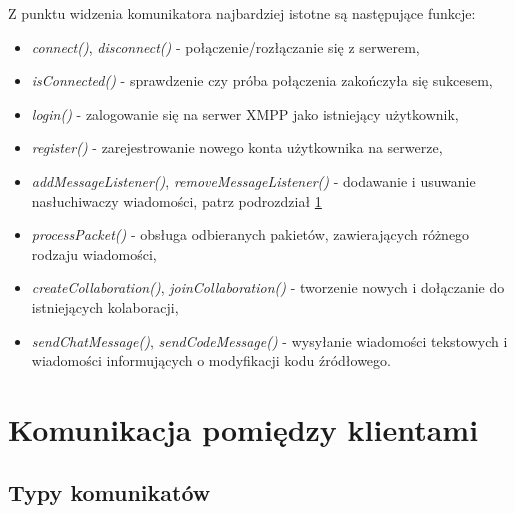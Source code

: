 \documentclass[polish,11pt,a4paper,twoside]{article}
\newenvironment{items}{
\begin{itemize}
  \setlength{\itemsep}{0pt}
  \setlength{\parskip}{0pt}
  \setlength{\parsep}{0pt}
  \setlength{\topsep}{0pt}
  \setlength{\partopsep}{0pt}
}{\end{itemize}}
\begin{document}
Z punktu widzenia komunikatora najbardziej istotne są następujące funkcje:
\begin{items}
\item \emph{connect()}, \emph{disconnect()} - połączenie/rozłączanie się z serwerem,
\item \emph{isConnected()} - sprawdzenie czy próba połączenia zakończyła się sukcesem,
\item \emph{login()} - zalogowanie się na serwer XMPP jako istniejący użytkownik,
\item \emph{register()} - zarejestrowanie nowego konta użytkownika na serwerze,
\item \emph{addMessageListener()}, \emph{removeMessageListener()} - dodawanie i usuwanie nasłuchiwaczy wiadomości, patrz podrozdział \ref{sec:komunikacja}
\item \emph{processPacket()} - obsługa odbieranych pakietów, zawierających różnego rodzaju wiadomości,
\item \emph{createCollaboration()}, \emph{joinCollaboration()} - tworzenie nowych i dołączanie do istniejących kolaboracji,
\item \emph{sendChatMessage()}, \emph{sendCodeMessage()} - wysyłanie wiadomości tekstowych i wiadomości informujących o modyfikacji kodu źródłowego.
\end{items}

\clearpage

\section{Komunikacja pomiędzy klientami}
\label{sec:komunikacja}

\subsection{Typy komunikatów}
\end{document}

